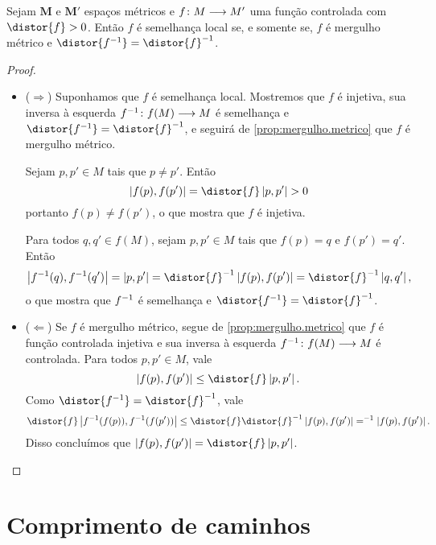 \begin{proposition}
\label{prop:}
Sejam $\bm{M}$ e $\bm{M'}$ espaços métricos e ${f}\colon {M} \longrightarrow {M'}$ uma função controlada com $\distor{f}>0$. Então $f$ é semelhança local se, e somente se, $f$ é mergulho métrico e $\distor{f\inv}=\distor{f}\inv$.
\end{proposition}
\begin{proof}
	\begin{itemize}
	\item ($\Rightarrow$) Suponhamos que $f$ é semelhança local. Mostremos que $f$ é injetiva, sua inversa à esquerda ${f^{-1}}\colon {f(M)} \longrightarrow {M}$ é semelhança e $\distor{f\inv}=\distor{f}\inv$, e seguirá de \ref{prop:mergulho.metrico} que $f$ é mergulho métrico.

	Sejam $p,p' \in M$ tais que $p \neq p'$. Então
		\begin{equation*}
		\dist{f(p)}{f(p')} = \distor{f}\dist{p}{p'} > 0
		\end{equation*}
	portanto $f(p) \neq f(p')$, o que mostra que $f$ é injetiva.

	Para todos $q,q' \in f(M)$, sejam $p,p' \in M$ tais que $f(p)=q$ e $f(p')=q'$. Então
		\begin{equation*}
		\dist{f\inv(q)}{f\inv(q')} = \dist{p}{p'} = \distor{f}\inv\dist{f(p)}{f(p')} = \distor{f}\inv\dist{q}{q'},
		\end{equation*}
	o que mostra que $f^{-1}$ é semelhança e $\distor{f\inv}=\distor{f}\inv$.

	\item ($\Leftarrow$) Se $f$ é mergulho métrico, segue de \ref{prop:mergulho.metrico} que $f$ é função controlada injetiva e sua inversa à esquerda ${f^{-1}}\colon {f(M)} \longrightarrow {M}$ é controlada. Para todos $p,p' \in M$, vale
		\begin{equation*}
		\dist{f(p)}{f(p')} \leq \distor{f}\dist{p}{p'}.
		\end{equation*}
	Como $\distor{f\inv} = \distor{f}\inv$, vale
		\begin{equation*}
			\distor{f}\dist{f\inv(f(p))}{f\inv(f(p'))} \leq \distor{f}\distor{f}\inv\dist{f(p)}{f(p')} = \inv\dist{f(p)}{f(p')}.
		\end{equation*}
	Disso concluímos que $\dist{f(p)}{f(p')} = \distor{f}\dist{p}{p'}$.
	\qedhere
	\end{itemize}
\end{proof}








\section{Comprimento de caminhos}

